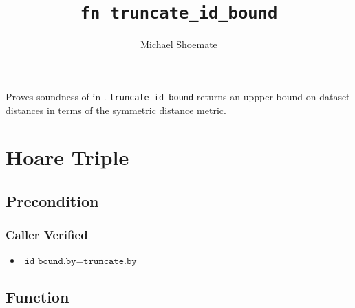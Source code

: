 \documentclass{article}
\title{\texttt{fn truncate\_id\_bound}}
\author{Michael Shoemate}
\begin{document}
\maketitle  


\contrib

Proves soundness of  
in .
\texttt{truncate\_id\_bound} returns an uppper bound on dataset distances in terms of the symmetric distance metric.

\section{Hoare Triple}
\subsection*{Precondition}
\subsubsection*{Caller Verified}
\begin{itemize}
    \item $\texttt{id\_bound.by} = \texttt{truncate.by}$
\end{itemize}


\subsection*{Function}
\label{sec:python-pseudocode}

\end{document}
